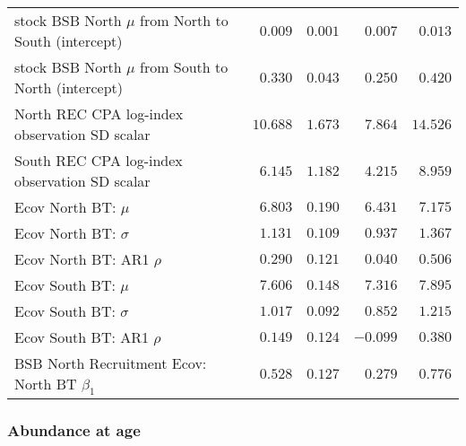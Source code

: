 \documentclass[
]{article}
\begin{document}
\begin{landscape}
\begin{longtable}[t]{lrrrr}
stock BSB North $\mu$ from North to South (intercept) & $0.009$ & $0.001$ & $0.007$ & $0.013$\\
stock BSB North $\mu$ from South to North (intercept) & $0.330$ & $0.043$ & $0.250$ & $0.420$\\
North REC CPA log-index observation SD scalar & $10.688$ & $1.673$ & $7.864$ & $14.526$\\
South REC CPA log-index observation SD scalar & $6.145$ & $1.182$ & $4.215$ & $8.959$\\
\addlinespace
Ecov North BT: $\mu$ & $6.803$ & $0.190$ & $6.431$ & $7.175$\\
Ecov North BT: $\sigma$ & $1.131$ & $0.109$ & $0.937$ & $1.367$\\
Ecov North BT: AR1 $\rho$ & $0.290$ & $0.121$ & $0.040$ & $0.506$\\
Ecov South BT: $\mu$ & $7.606$ & $0.148$ & $7.316$ & $7.895$\\
Ecov South BT: $\sigma$ & $1.017$ & $0.092$ & $0.852$ & $1.215$\\
\addlinespace
Ecov South BT: AR1 $\rho$ & $0.149$ & $0.124$ & $-0.099$ & $0.380$\\
BSB North Recruitment Ecov: North BT $\beta_1$ & $0.528$ & $0.127$ & $0.279$ & $0.776$\\*
\end{longtable}
\end{landscape}

\hypertarget{abundance-at-age}{%
\subsubsection{Abundance at age}\label{abundance-at-age}}
\end{document}
